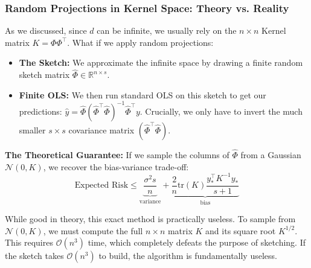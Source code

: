 \documentclass[
11pt,notheorems,hyperref={pdfauthor=whatever}
]{beamer}
\begin{document}
\begin{frame}
    \frametitle{Random Projections in Kernel Space: Theory vs. Reality}

    As we discussed, since \(d\) can be infinite, we usually rely on the \(n \times n\) Kernel matrix \(K = \Phi\Phi^\top\). What if we apply random projections:
    
    \begin{itemize}
        \item \alert{\textbf{The Sketch:}} We approximate the infinite space by drawing a finite random sketch matrix \(\hat{\Phi} \in \mathbb{R}^{n \times s}\). 
        \item \alert{\textbf{Finite OLS:}} We then run standard OLS on this sketch to get our predictions: \(\hat{y} = \hat{\Phi}(\hat{\Phi}^\top \hat{\Phi})^{-1}\hat{\Phi}^\top y\). Crucially, we only have to invert the much smaller \(s \times s\) covariance matrix \((\hat{\Phi}^\top \hat{\Phi})\).
    \end{itemize}

    \vspace{0.2cm}
    \textbf{The Theoretical Guarantee:} If we sample the columns of \(\hat{\Phi}\) from a Gaussian \(\mathcal{N}(0, K)\), we recover the bias-variance trade-off:
    \[
        \text{Expected Risk} \le \underbrace{\frac{\sigma^2 s}{n}}_{\text{variance}} + \underbrace{\frac{2}{n}\text{tr}(K)\frac{y_*^\top K^{-1} y_*}{s+1}}_{\text{bias}}
    \]

    \vspace{0.1cm}
    While good in theory, this exact method is practically useless. To sample from \(\mathcal{N}(0, K)\), we must compute the full \(n \times n\) matrix \(K\) and its square root \(K^{1/2}\). This requires \(\mathcal{O}(n^3)\) time, which completely defeats the purpose of sketching. If the sketch takes \(\mathcal{O}(n^3)\) to build, the algorithm is fundamentally useless.
\end{frame}
\end{document}
